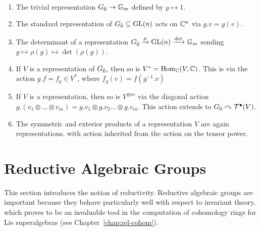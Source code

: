 \begin{example}~
  \begin{enumerate}
  \item The trivial representation ${G}_{\bar{0}} \to \mathbb{G}_m$ defined by $g \mapsto 1$.
  \item The standard representation of ${G}_{\bar{0}} \subseteq \operatorname{GL}(n)$ acts on $\mathbb{C}^n$ via $g.v = g(v)$.
  \item The determinant of a representation ${G}_{\bar{0}} \xrightarrow{\rho} \operatorname{GL}(n) \xrightarrow{\det} \mathbb{G}_m$ sending $g \mapsto \rho(g) \mapsto \det(\rho(g))$.
  \item If $V$ is a representation of ${G}_{\bar{0}}$, then so is $V^* = \operatorname{Hom}_{\mathbb{C}}(V,\mathbb{C})$. This is via the action $g.f = f_g \in V^*$, where $f_g(v) = f(g^{-1}.v)$
  \item If $V$ is a representation, then so is $V^{\otimes m}$ via the diagonal action $g.(v_1 \otimes \ldots \otimes v_m) = g.v_1 \otimes g.v_2 \ldots \otimes g.v_m$. This action extends to ${G}_{\bar{0}} \curvearrowright \mathcal{T}^\bullet(V)$.
  \item The symmetric and exterior products of a representation $V$ are again representations, with action inherited from the action on the tensor power.
  \end{enumerate}
\end{example}

\section{Reductive Algebraic Groups}
\label{sec:reductive}

This section introduces the notion of reductivity. Reductive algebraic groups are important because they behave particularly well with respect to invariant theory, which proves to be an invaluable tool in the computation of cohomology rings for Lie superalgebras (see Chapter~\ref{chap:rel-cohom}).

